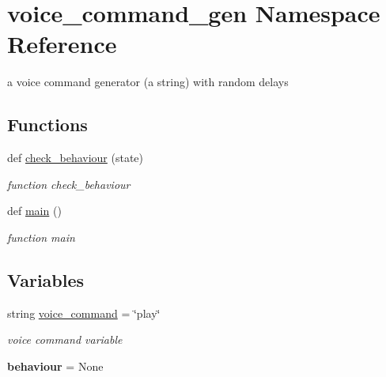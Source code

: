 \hypertarget{namespacevoice__command__gen}{}\section{voice\+\_\+command\+\_\+gen Namespace Reference}
\label{namespacevoice__command__gen}


a voice command generator (a string) with random delays  


\subsection*{Functions}
\begin{DoxyCompactItemize}
\item 
def \hyperlink{namespacevoice__command__gen_ae128380f6ff2c307c824c4a7e612ac22}{check\+\_\+behaviour} (state)
\begin{DoxyCompactList}\small\item\em function check\+\_\+behaviour \end{DoxyCompactList}\item 
\mbox{\label{namespacevoice__command__gen_afb9f4ea012344d9e6d406f0182ac8261}} 
def \hyperlink{namespacevoice__command__gen_afb9f4ea012344d9e6d406f0182ac8261}{main} ()
\begin{DoxyCompactList}\small\item\em function main \end{DoxyCompactList}\end{DoxyCompactItemize}
\subsection*{Variables}
\begin{DoxyCompactItemize}
\item 
\mbox{\label{namespacevoice__command__gen_aba5066dd09d12510c5bc9e98a0b2cc0b}} 
string \hyperlink{namespacevoice__command__gen_aba5066dd09d12510c5bc9e98a0b2cc0b}{voice\+\_\+command} = \char`\"{}play\char`\"{}
\begin{DoxyCompactList}\small\item\em voice command variable \end{DoxyCompactList}\item 
\mbox{\label{namespacevoice__command__gen_ab08c1fcac3cd4922b214a3c31297b670}} 
{\bfseries behaviour} = None
\end{DoxyCompactItemize}


